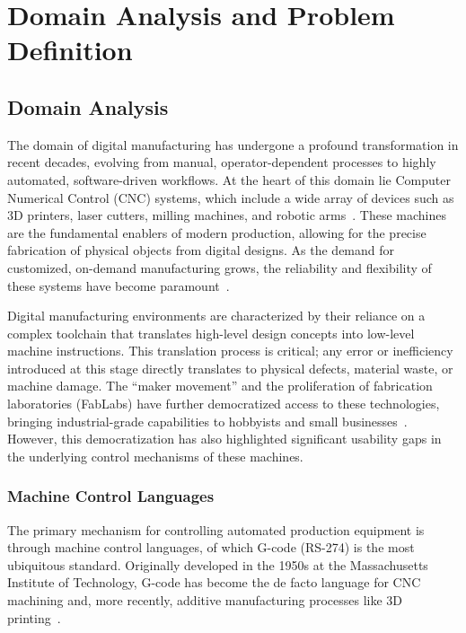 \chapter{Domain Analysis and Problem Definition}

\section{Domain Analysis}

The domain of digital manufacturing has undergone a profound transformation in recent decades, evolving from manual, operator-dependent processes to highly automated, software-driven workflows. At the heart of this domain lie Computer Numerical Control (CNC) systems, which include a wide array of devices such as 3D printers, laser cutters, milling machines, and robotic arms~\cite{noauthor_global_nodate}. These machines are the fundamental enablers of modern production, allowing for the precise fabrication of physical objects from digital designs. As the demand for customized, on-demand manufacturing grows, the reliability and flexibility of these systems have become paramount~\cite{mavri_survey_2021}.

Digital manufacturing environments are characterized by their reliance on a complex toolchain that translates high-level design concepts into low-level machine instructions. This translation process is critical; any error or inefficiency introduced at this stage directly translates to physical defects, material waste, or machine damage. The ``maker movement'' and the proliferation of fabrication laboratories (FabLabs) have further democratized access to these technologies, bringing industrial-grade capabilities to hobbyists and small businesses~\cite{cycles_topic_nodate, noauthor_between_2025}. However, this democratization has also highlighted significant usability gaps in the underlying control mechanisms of these machines.

\subsection{Machine Control Languages}

The primary mechanism for controlling automated production equipment is through machine control languages, of which G-code (RS-274) is the most ubiquitous standard. Originally developed in the 1950s at the Massachusetts Institute of Technology, G-code has become the de facto language for CNC machining and, more recently, additive manufacturing processes like 3D printing~\cite{arroyo_generating_2011}.

